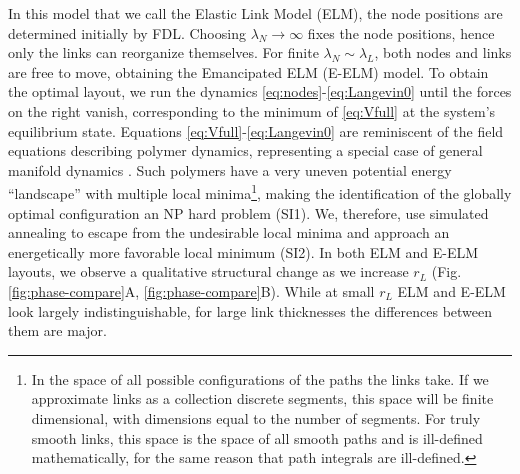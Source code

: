 \documentclass[nofootinbib,preprint,floatfix,titlepage,endfloats]{revtex4} %
\begin{document}
In this model that we call the Elastic Link Model (ELM), the node positions are determined initially by FDL.
Choosing $\lambda_N\to \infty$ fixes the node positions, hence only the links can reorganize themselves. For finite $\lambda_N \sim \lambda_L$, both nodes and links are free to move, obtaining the Emancipated ELM (E-ELM) model. To obtain the optimal layout, we run the dynamics  \eqref{eq:nodes}-\eqref{eq:Langevin0} until the forces on the right 
vanish, corresponding to the minimum of \eqref{eq:Vfull} at the system's equilibrium state. Equations \eqref{eq:Vfull}-\eqref{eq:Langevin0} are reminiscent of the field equations describing polymer dynamics, representing a special case of general manifold dynamics \cite{mezard1991replica}. Such polymers have a very uneven potential energy ``landscape'' \cite{parisi2002physical} with multiple local minima\footnote{In the space of all possible configurations of the paths the links take.
If we approximate links as a collection discrete segments, this space will be finite dimensional, with dimensions equal to the number of segments. 
For truly smooth links, this space is the space of all smooth paths and is ill-defined mathematically, for the same reason that path integrals are ill-defined.}, making the identification of the globally optimal configuration   
 an NP hard problem (SI1).
We, therefore, use simulated annealing \cite{hwang1988simulated} to escape from the undesirable local minima and approach an energetically more favorable local minimum (SI2).
In both ELM and E-ELM layouts, we observe a qualitative structural change as we increase $r_L$  (Fig. \ref{fig:phase-compare}A, \ref{fig:phase-compare}B). While at small $r_L$ ELM and E-ELM look largely indistinguishable, for large link thicknesses the differences between them are major. 
\end{document}
